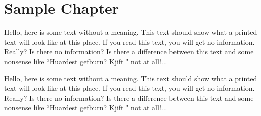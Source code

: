 \documentclass[a4paper,12pt,twoside]{book}
\begin{document}
    \chapter{Sample Chapter}
    
    Hello, here is some text without a meaning.  This text should 
    show what a printed text will look like at this place.  If you 
    read this text, you will get no information.  Really?  Is there 
    no information?  Is there a difference between this text and some 
    nonsense like ``Huardest gefburn?  Kjift " not at all!...
    
    \newpage
    Hello, here is some text without a meaning.  This text should 
    show what a printed text will look like at this place.  If you 
    read this text, you will get no information.  Really?  Is there 
    no information?  Is there a difference between this text and some 
    nonsense like ``Huardest gefburn?  Kjift " not at all!...
\end{document}
